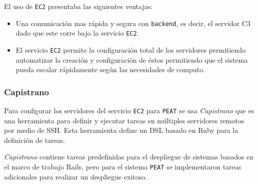 El uso de \texttt{EC2} presentaba las siguientes ventajas:
\begin{itemize}
\item Una comunicación mas rápida y segura con \texttt{backend}, es decir, el
  servidor C3 dado que este corre bajo la servicio \texttt{EC2}.
\item El servicio \texttt{EC2} permite la configuración total de los servidores
  permitiendo automatizar la creación y configuración de éstos permitiendo
  que el sistema pueda escalar rápidamente según las necesidades de computo.
\end{itemize}

\subsubsection{Capistrano}

Para configurar los servidores del servicio \texttt{EC2} para \texttt{PEAT} se usa
\textit{Capistrano} que es una herramienta para definir y ejecutar tareas en
múltiples servidores remotos por medio de SSH. Esta herramienta define un DSL
basado en Ruby para la definición de tareas.

\textit{Capistrano} contiene tareas predefinidas para el despliegue de sistemas
basados en el marco de trabajo Rails, pero para el sistema \texttt{PEAT} se
implementaron tareas adicionales para realizar un despliegue exitoso.
